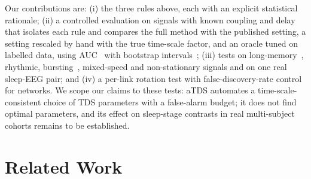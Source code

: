 \documentclass[11pt,a4paper]{article}
\begin{document}
Our contributions are: (i) the three rules above, each with an explicit statistical rationale; (ii) a controlled evaluation on signals with known coupling and delay that isolates each rule and compares the full method with the published setting, a setting rescaled by hand with the true time-scale factor, and an oracle tuned on labelled data, using AUC~\cite{Hanley1982MeaningUse} with bootstrap intervals~\cite{Efron1979BootstrapMethods}; (iii) tests on long-memory~\cite{Davies1987TestsHurst,Peng1995QuantificationScaling}, rhythmic, bursting~\cite{Rulkov2002ModelingSpikingbursting}, mixed-speed and non-stationary signals and on one real sleep-EEG pair; and (iv) a per-link rotation test with false-discovery-rate control~\cite{Benjamini1995ControllingFalse} for networks. We scope our claims to these tests: aTDS automates a time-scale-consistent choice of TDS parameters with a false-alarm budget; it does not find optimal parameters, and its effect on sleep-stage contrasts in real multi-subject cohorts remains to be established.

\section{Related Work}
\label{sec:related_work}
\end{document}
